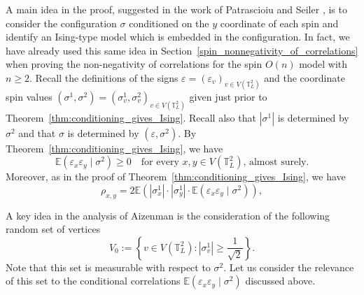 \documentclass[12pt,reqno]{article}
\def\E{\mathbb{E}}
\def\T{\mathbb{T}}
\def\eps{\varepsilon}
\begin{document}
\medbreak
{}
A main idea in the proof, suggested in the work of Patrascioiu and Seiler \cite{PatSei92}, is to consider the configuration $\sigma$ conditioned on the $y$ coordinate of each spin and identify an Ising-type model which is embedded in the configuration. In fact, we have already used this same idea in Section~\ref{spin_nonnegativity_of_correlations} when proving the non-negativity of correlations for the spin $O(n)$ model with $n \ge 2$.
Recall the definitions of the signs $\eps = (\eps_v)_{v \in V(\T_L^2)}$ and the coordinate spin values $(\sigma^1,\sigma^2) = (\sigma^1_v,\sigma^2_v)_{v \in V(\T_L^2)}$ given just prior to Theorem~\ref{thm:conditioning_gives_Ising}.
Recall also that $|\sigma^1|$ is determined by $\sigma^2$ and that $\sigma$ is determined by $(\eps,\sigma^2)$.
By Theorem~\ref{thm:conditioning_gives_Ising}, we have
 \begin{equation}\label{eq:non-negativity_of_conditional_correlations}
   \E(\eps_x \eps_y\; |\; \sigma^2)\ge 0\quad\text{for every $x,y\in V(\T_L^2)$, almost surely.}
\end{equation}
Moreover, as in the proof of Theorem~\ref{thm:conditioning_gives_Ising}, we have
\begin{equation}\label{eq:correlations_in_term_of_sign_variables}
  \rho_{x,y} = 2\E(|\sigma_x^1|\cdot |\sigma_y^1|\cdot\E(\eps_x \eps_y\; |\; \sigma^2)),
\end{equation}

\medbreak
{} A key idea in the analysis of Aizenman \cite{Aiz94} is the consideration of the following random set of vertices
\begin{equation*}
  V_0 := \left\{v\in V(\T_L^2)\colon |\sigma_v^1| \ge \frac{1}{\sqrt{2}}\right\}.
\end{equation*}
Note that this set is measurable with respect to $\sigma^2$. Let us consider the relevance of this set to the conditional correlations $\E(\eps_x \eps_y\; |\; \sigma^2)$ discussed above.
\end{document}
